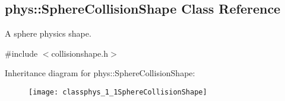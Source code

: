 \hypertarget{classphys_1_1SphereCollisionShape}{
\subsection{phys::SphereCollisionShape Class Reference}
\label{classphys_1_1SphereCollisionShape}
}


A sphere physics shape.  




{\ttfamily \#include $<$collisionshape.h$>$}

Inheritance diagram for phys::SphereCollisionShape:\begin{figure}[H]
\begin{center}
\leavevmode
\texttt{[image: classphys\_1\_1SphereCollisionShape]}
\end{center}
\end{figure}
